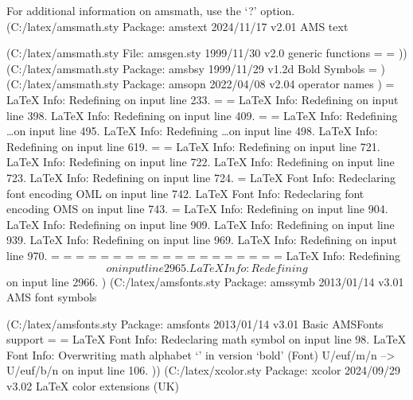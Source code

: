 For additional information on amsmath, use the `?' option.
(C:\MikTeX\tex/latex/amsmath\amstext.sty
Package: amstext 2024/11/17 v2.01 AMS text

(C:\MikTeX\tex/latex/amsmath\amsgen.sty
File: amsgen.sty 1999/11/30 v2.0 generic functions
\@emptytoks=
\ex@=
))
(C:\MikTeX\tex/latex/amsmath\amsbsy.sty
Package: amsbsy 1999/11/29 v1.2d Bold Symbols
\pmbraise@=
)
(C:\MikTeX\tex/latex/amsmath\amsopn.sty
Package: amsopn 2022/04/08 v2.04 operator names
)
\inf@bad=
LaTeX Info: Redefining \frac on input line 233.
\uproot@=
\leftroot@=
LaTeX Info: Redefining \overline on input line 398.
LaTeX Info: Redefining \colon on input line 409.
\classnum@=
\DOTSCASE@=
LaTeX Info: Redefining \ldots on input line 495.
LaTeX Info: Redefining \dots on input line 498.
LaTeX Info: Redefining \cdots on input line 619.
\Mathstrutbox@=
\strutbox@=
LaTeX Info: Redefining \big on input line 721.
LaTeX Info: Redefining \Big on input line 722.
LaTeX Info: Redefining \bigg on input line 723.
LaTeX Info: Redefining \Bigg on input line 724.
\big@size=
LaTeX Font Info:    Redeclaring font encoding OML on input line 742.
LaTeX Font Info:    Redeclaring font encoding OMS on input line 743.
\macc@depth=
LaTeX Info: Redefining \bmod on input line 904.
LaTeX Info: Redefining \pmod on input line 909.
LaTeX Info: Redefining \smash on input line 939.
LaTeX Info: Redefining \relbar on input line 969.
LaTeX Info: Redefining \Relbar on input line 970.
\c@MaxMatrixCols=
\dotsspace@=
\c@parentequation=
\dspbrk@lvl=
\tag@help=
\row@=
\column@=
\maxfields@=
\andhelp@=
\eqnshift@=
\alignsep@=
\tagshift@=
\tagwidth@=
\totwidth@=
\lineht@=
\@envbody=
\multlinegap=
\multlinetaggap=
\mathdisplay@stack=
LaTeX Info: Redefining \[ on input line 2965.
LaTeX Info: Redefining \] on input line 2966.
)
(C:\MikTeX\tex/latex/amsfonts\amssymb.sty
Package: amssymb 2013/01/14 v3.01 AMS font symbols

(C:\MikTeX\tex/latex/amsfonts\amsfonts.sty
Package: amsfonts 2013/01/14 v3.01 Basic AMSFonts support
\symAMSa=
\symAMSb=
LaTeX Font Info:    Redeclaring math symbol \hbar on input line 98.
LaTeX Font Info:    Overwriting math alphabet `\mathfrak' in version `bold'
(Font)                  U/euf/m/n --> U/euf/b/n on input line 106.
))
(C:\MikTeX\tex/latex/xcolor\xcolor.sty
Package: xcolor 2024/09/29 v3.02 LaTeX color extensions (UK)

